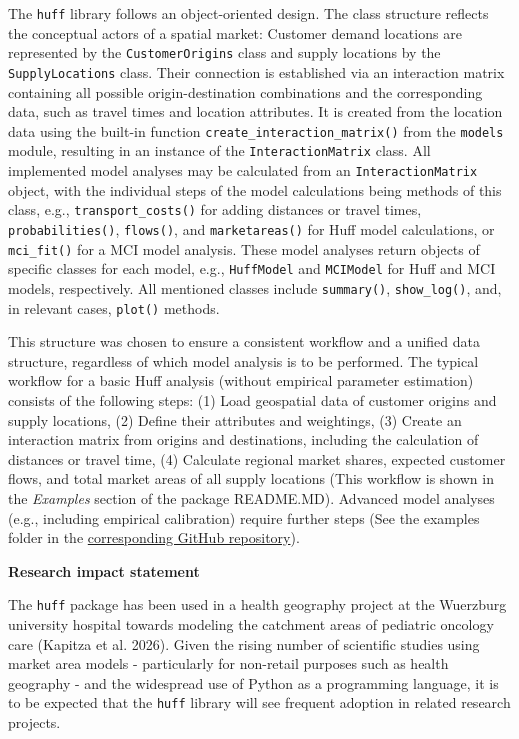 \documentclass[
]{article}
\begin{document}
The \texttt{huff} library follows an object-oriented design. The class
structure reflects the conceptual actors of a spatial market: Customer
demand locations are represented by the \texttt{CustomerOrigins} class
and supply locations by the \texttt{SupplyLocations} class. Their
connection is established via an interaction matrix containing all
possible origin-destination combinations and the corresponding data,
such as travel times and location attributes. It is created from the
location data using the built-in function
\texttt{create\_interaction\_matrix()} from the \texttt{models} module,
resulting in an instance of the \texttt{InteractionMatrix} class. All
implemented model analyses may be calculated from an
\texttt{InteractionMatrix} object, with the individual steps of the
model calculations being methods of this class, e.g.,
\texttt{transport\_costs()} for adding distances or travel times,
\texttt{probabilities()}, \texttt{flows()}, and \texttt{marketareas()}
for Huff model calculations, or \texttt{mci\_fit()} for a MCI model
analysis. These model analyses return objects of specific classes for
each model, e.g., \texttt{HuffModel} and \texttt{MCIModel} for Huff and
MCI models, respectively. All mentioned classes include
\texttt{summary()}, \texttt{show\_log()}, and, in relevant cases,
\texttt{plot()} methods.

This structure was chosen to ensure a consistent workflow and a unified
data structure, regardless of which model analysis is to be performed.
The typical workflow for a basic Huff analysis (without empirical
parameter estimation) consists of the following steps: (1) Load
geospatial data of customer origins and supply locations, (2) Define
their attributes and weightings, (3) Create an interaction matrix from
origins and destinations, including the calculation of distances or
travel time, (4) Calculate regional market shares, expected customer
flows, and total market areas of all supply locations (This workflow is
shown in the \emph{Examples} section of the package README.MD). Advanced
model analyses (e.g., including empirical calibration) require further
steps (See the examples folder in the
\href{http://www.github.com/geowieland/huff_official.git}{corresponding
GitHub repository}).

\textbf{Research impact statement}

The \texttt{huff} package has been used in a health geography project at
the Wuerzburg university hospital towards modeling the catchment areas
of pediatric oncology care (Kapitza et al. 2026). Given the rising
number of scientific studies using market area models - particularly for
non-retail purposes such as health geography - and the widespread use of
Python as a programming language, it is to be expected that the
\texttt{huff} library will see frequent adoption in related research
projects.
\end{document}
